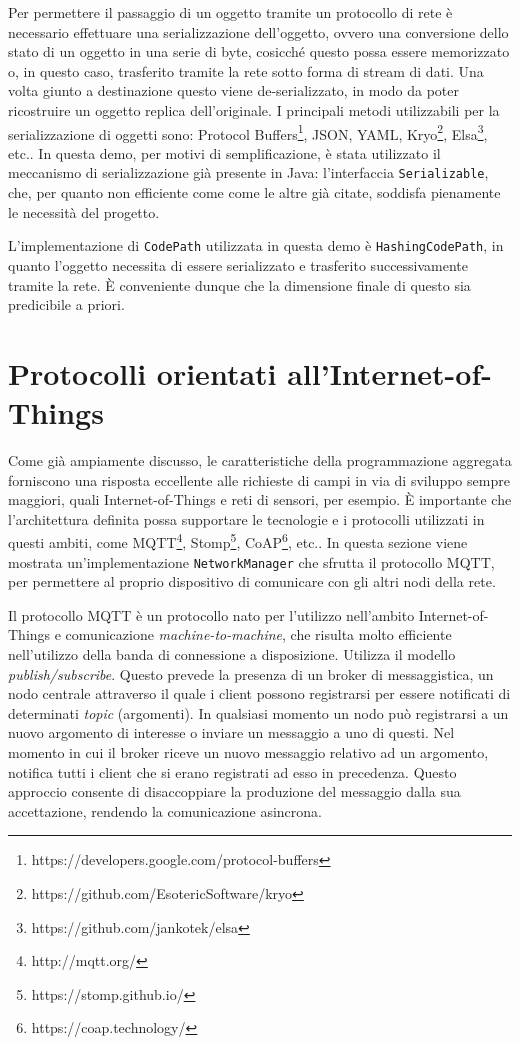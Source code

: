 Per permettere il passaggio di un oggetto tramite un protocollo di rete è
necessario effettuare una serializzazione dell'oggetto, ovvero una conversione
dello stato di un oggetto in una serie di byte, cosicché questo possa essere
memorizzato o, in questo caso, trasferito tramite la rete sotto forma di stream
di dati. Una volta giunto a destinazione questo viene de-serializzato, in modo
da poter ricostruire un oggetto replica dell'originale. I principali metodi
utilizzabili per la serializzazione di oggetti sono: Protocol
Buffers\footnote{https://developers.google.com/protocol-buffers}, JSON, YAML,
Kryo\footnote{https://github.com/EsotericSoftware/kryo},
Elsa\footnote{https://github.com/jankotek/elsa}, etc.. In questa demo, per
motivi di semplificazione, è stata utilizzato il meccanismo di serializzazione
già presente in Java: l'interfaccia \texttt{Serializable}, che, per quanto non
efficiente come come le altre già citate, soddisfa pienamente le necessità del
progetto.

L'implementazione di \texttt{CodePath} utilizzata in questa demo è
\texttt{HashingCodePath}, in quanto l'oggetto necessita di essere serializzato e
trasferito successivamente tramite la rete. È conveniente dunque che la
dimensione finale di questo sia predicibile a priori.

\section{Protocolli orientati all'Internet-of-Things}
Come già ampiamente discusso, le caratteristiche della programmazione aggregata
forniscono una risposta eccellente alle richieste di campi in via di sviluppo
sempre maggiori, quali Internet-of-Things e reti di sensori, per esempio. È
importante che l'architettura definita possa supportare le tecnologie e i
protocolli utilizzati in questi ambiti, come MQTT\footnote{http://mqtt.org/},
Stomp\footnote{https://stomp.github.io/},
CoAP\footnote{https://coap.technology/}, etc.. In questa sezione viene mostrata
un'implementazione \texttt{NetworkManager} che sfrutta il protocollo MQTT, per
permettere al proprio dispositivo di comunicare con gli altri nodi della rete.

Il protocollo MQTT è un protocollo nato per l'utilizzo nell'ambito
Internet-of-Things e comunicazione \textit{machine-to-machine}, che risulta molto
efficiente nell'utilizzo della banda di connessione a disposizione. Utilizza il
modello \textit{publish/subscribe}. Questo prevede la presenza di un broker di
messaggistica, un nodo centrale attraverso il quale i client possono registrarsi
per essere notificati di determinati \textit{topic} (argomenti). In qualsiasi
momento un nodo può registrarsi a un nuovo argomento di interesse o inviare un
messaggio a uno di questi. Nel momento in cui il broker riceve un nuovo
messaggio relativo ad un argomento, notifica tutti i client che si erano
registrati ad esso in precedenza. Questo approccio consente di disaccoppiare la
produzione del messaggio dalla sua accettazione, rendendo la comunicazione
asincrona.

